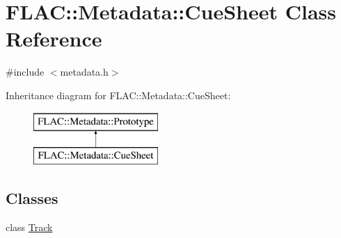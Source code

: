 \hypertarget{class_f_l_a_c_1_1_metadata_1_1_cue_sheet}{}\section{F\+L\+AC\+:\+:Metadata\+:\+:Cue\+Sheet Class Reference}
\label{class_f_l_a_c_1_1_metadata_1_1_cue_sheet}


{\ttfamily \#include $<$metadata.\+h$>$}

Inheritance diagram for F\+L\+AC\+:\+:Metadata\+:\+:Cue\+Sheet\+:\begin{figure}[H]
\begin{center}
\leavevmode
\includegraphics[height=2.000000cm]{class_f_l_a_c_1_1_metadata_1_1_cue_sheet}
\end{center}
\end{figure}
\subsection*{Classes}
\begin{DoxyCompactItemize}
\item 
class \hyperlink{class_f_l_a_c_1_1_metadata_1_1_cue_sheet_1_1_track}{Track}
\end{DoxyCompactItemize}
